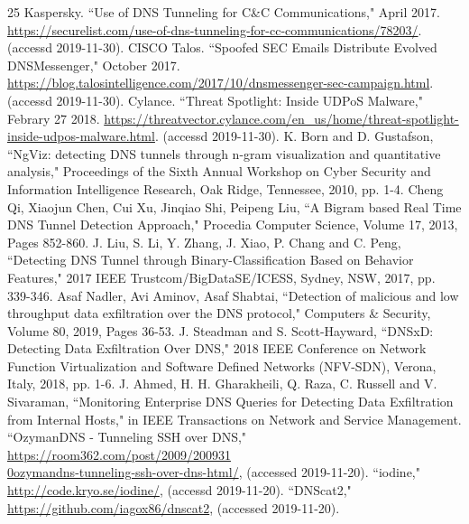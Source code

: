 \documentclass[12pt]{jarticle} %
\begin{document}
\begin{thebibliography} {25}
  Kaspersky. ``Use of DNS Tunneling for C\&C Communications," April 2017. \href{https://securelist.com/use-of-dns-tunneling-for-cc-communications/78203/}{https://securelist.com/use-of-dns-tunneling-for-cc-communications/78203/}. (accessd 2019-11-30).
  CISCO Talos. ``Spoofed SEC Emails Distribute Evolved DNSMessenger," October 2017. \href{https://blog.talosintelligence.com/2017/10/dnsmessenger-sec-campaign.html}{https://blog.talosintelligence.com/2017/10/dnsmessenger-sec-campaign.html}. (accessd 2019-11-30).
  Cylance. ``Threat Spotlight: Inside UDPoS Malware," Febrary 27 2018. \href{https://threatvector.cylance.com/en\_us/home/threat-spotlight-inside-udpos-malware.html}{https://threatvector.cylance.com/en\_us/home/threat-spotlight-inside-udpos-malware.html}. (accessd 2019-11-30).
  K. Born and D. Gustafson, ``NgViz: detecting DNS tunnels through n-gram visualization and quantitative analysis," Proceedings of the Sixth Annual Workshop on Cyber Security and Information Intelligence Research, Oak Ridge, Tennessee, 2010, pp. 1-4.
  Cheng Qi, Xiaojun Chen, Cui Xu, Jinqiao Shi, Peipeng Liu, ``A Bigram based Real Time DNS Tunnel Detection Approach," Procedia Computer Science, Volume 17, 2013, Pages 852-860.
  J. Liu, S. Li, Y. Zhang, J. Xiao, P. Chang and C. Peng, ``Detecting DNS Tunnel through Binary-Classification Based on Behavior Features," 2017 IEEE Trustcom/BigDataSE/ICESS, Sydney, NSW, 2017, pp. 339-346.
  Asaf Nadler, Avi Aminov, Asaf Shabtai, ``Detection of malicious and low throughput data exfiltration over the DNS protocol," Computers \& Security, Volume 80, 2019, Pages 36-53.
  J. Steadman and S. Scott-Hayward, ``DNSxD: Detecting Data Exfiltration Over DNS," 2018 IEEE Conference on Network Function Virtualization and Software Defined Networks (NFV-SDN), Verona, Italy, 2018, pp. 1-6.
  J. Ahmed, H. H. Gharakheili, Q. Raza, C. Russell and V. Sivaraman, ``Monitoring Enterprise DNS Queries for Detecting Data Exfiltration from Internal Hosts," in IEEE Transactions on Network and Service Management.
  ``OzymanDNS - Tunneling SSH over DNS," \href{https://room362.com/post/2009/2009310ozymandns-tunneling-ssh-over-dns-html/}{https://room362.com/post/2009/200931\\0ozymandns-tunneling-ssh-over-dns-html/}, (accessed 2019-11-20).
  ``iodine," \href{http://code.kryo.se/iodine/}{http://code.kryo.se/iodine/}, (accessd 2019-11-20).
  ``DNScat2," \href{https://github.com/iagox86/dnscat2}{https://github.com/iagox86/dnscat2}, (accessed 2019-11-20).
\end{thebibliography}

\end{document}

